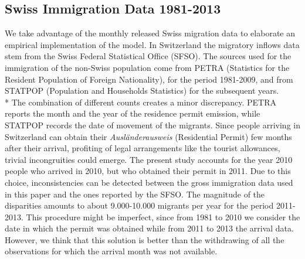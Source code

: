 \documentclass{article}\usepackage[]{graphicx}\usepackage[]{color}
\begin{document}
\subsection{Swiss Immigration Data 1981-2013}\label{Empirics}

We take advantage of the monthly released Swiss migration data to elaborate an empirical implementation of the model. In Switzerland the migratory inflows data stem from the Swiss Federal Statistical Office (SFSO). The sources used for the immigration of the non-Swiss population come from PETRA (Statistics for the Resident Population of Foreign Nationality), for the period 1981-2009, and from STATPOP (Population and Households Statistics) for the subsequent years.\\*
The combination of different counts creates a minor discrepancy. PETRA reports the month and the year of the residence permit emission, while STATPOP records the date of movement of the migrants. Since people arriving in Switzerland can obtain their \textit{Ausl\"{a}nderausweis} (Residential Permit) few months after their arrival, profiting of legal arrangements like the tourist allowances, trivial incongruities could emerge. The present study accounts for the year 2010 people who arrived in 2010, but who obtained their permit in 2011. Due to this choice, inconsistencies can be detected between the gross immigration data used in this paper and the ones reported by the SFSO. The magnitude of the disparities amounts to about 9.000-10.000 migrants per year for the period 2011-2013. This procedure might be imperfect, since from 1981 to 2010 we consider the date in which the permit was obtained while from 2011 to 2013 the arrival data. However, we think that this solution is better than the withdrawing of all the observations for which the arrival month was not available. \\
\end{document}
